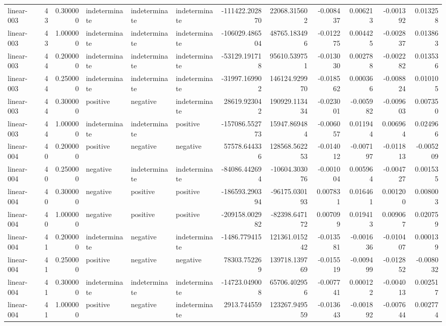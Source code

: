 \begin{tabular}{lrrlllrrrrrr}
linear-003 & 43 & 0.300000 & indeterminate & indeterminate & indeterminate & -111422.202870 & 22068.315602 & -0.008437 & 0.006213 & -0.001392 & 0.013258 \\
linear-003 & 43 & 1.000000 & indeterminate & indeterminate & indeterminate & -106029.486504 & 48765.183496 & -0.012275 & 0.004425 & -0.002837 & 0.013863 \\
linear-003 & 44 & 0.200000 & indeterminate & indeterminate & indeterminate & -53129.191718 & 95610.539751 & -0.013030 & 0.002788 & -0.002282 & 0.013536 \\
linear-003 & 44 & 0.250000 & indeterminate & indeterminate & indeterminate & -31997.169902 & 146124.929970 & -0.018562 & 0.000366 & -0.008824 & 0.010105 \\
linear-003 & 44 & 0.300000 & positive & negative & indeterminate & 28619.923042 & 190929.113434 & -0.023001 & -0.005982 & -0.009603 & 0.007350 \\
linear-003 & 44 & 1.000000 & indeterminate & indeterminate & positive & -157086.552773 & 15947.869484 & -0.006057 & 0.011944 & 0.006964 & 0.024966 \\
linear-004 & 40 & 0.200000 & positive & negative & negative & 57578.644336 & 128568.562253 & -0.014012 & -0.007197 & -0.011813 & -0.005209 \\
linear-004 & 40 & 0.250000 & negative & indeterminate & indeterminate & -84086.442694 & -10604.303076 & -0.001004 & 0.005964 & -0.004727 & 0.001535 \\
linear-004 & 40 & 0.300000 & negative & positive & positive & -186593.290394 & -96175.030193 & 0.007831 & 0.016461 & 0.001200 & 0.008003 \\
linear-004 & 40 & 1.000000 & negative & positive & positive & -209158.002982 & -82398.647172 & 0.007099 & 0.019413 & 0.009067 & 0.020759 \\
linear-004 & 41 & 0.200000 & indeterminate & negative & indeterminate & -1486.779415 & 121361.015242 & -0.013581 & -0.001636 & -0.010407 & 0.000139 \\
linear-004 & 41 & 0.250000 & positive & negative & negative & 78303.752269 & 139718.139769 & -0.015519 & -0.009499 & -0.012852 & -0.008032 \\
linear-004 & 41 & 0.300000 & indeterminate & indeterminate & indeterminate & -14723.049008 & 65706.402956 & -0.007741 & 0.000122 & -0.004013 & 0.002517 \\
linear-004 & 41 & 1.000000 & positive & negative & indeterminate & 2913.744559 & 123267.949559 & -0.013643 & -0.001892 & -0.007644 & 0.002774 \\

\end{tabular}
